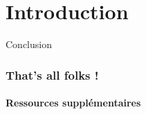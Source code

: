 \documentclass[compress,12pt,bookmark]{beamer}
\begin{document}
\section{Introduction}

\begin{frame}
    \centering
    \Huge
    Conclusion
\end{frame}


\begin{frame}
    \frametitle{That's all folks !}
    \framesubtitle{Ressources supplémentaires}


\end{frame}
\end{document}
